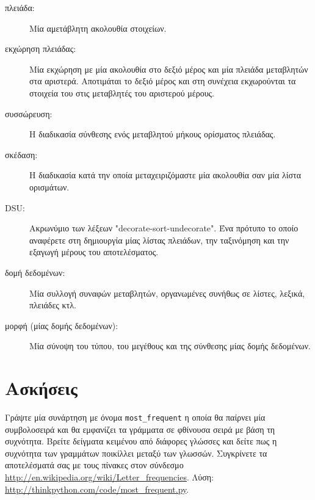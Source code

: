 \documentclass[10pt]{book}
\begin{document}
\begin{description}

\item[πλειάδα:] Μία αμετάβλητη ακολουθία στοιχείων.

\item[εκχώρηση πλειάδας:] Μία εκχώρηση με μία ακολουθία στο δεξιό μέρος και μία πλειάδα μεταβλητών στα αριστερά. Αποτιμάται το δεξιό μέρος και στη συνέχεια εκχωρούνται τα στοιχεία του στις μεταβλητές του αριστερού μέρους.

\item[συσσώρευση:] Η διαδικασία σύνθεσης ενός μεταβλητού μήκους ορίσματος πλειάδας.

\item[σκέδαση:] Η διαδικασία κατά την οποία μεταχειριζόμαστε μία ακολουθία σαν μία λίστα ορισμάτων.

\item[DSU:] Ακρωνύμιο των λέξεων "decorate-sort-undecorate". Ένα πρότυπο το οποίο αναφέρετε στη δημιουργία μίας λίστας πλειάδων, την ταξινόμηση και την εξαγωγή μέρους του αποτελέσματος.

\item[δομή δεδομένων:] Μία συλλογή συναφών μεταβλητών, οργανωμένες συνήθως σε λίστες, λεξικά, πλειάδες κτλ.

\item[μορφή (μίας δομής δεδομένων):] Μία σύνοψη του τύπου, του μεγέθους και της σύνθεσης μίας δομής δεδομένων.

\end{description}


\section{Ασκήσεις}

\begin{exercise}

Γράψτε μία συνάρτηση με όνομα \verb"most_frequent" η οποία θα παίρνει μία συμβολοσειρά και θα εμφανίζει τα γράμματα σε φθίνουσα σειρά με βάση τη συχνότητα. Βρείτε δείγματα κειμένου από διάφορες γλώσσες και δείτε πως η συχνότητα των γραμμάτων ποικίλλει μεταξύ των γλωσσών. Συγκρίνετε τα αποτελέσματά σας με τους πίνακες στον σύνδεσμο \url{http://en.wikipedia.org/wiki/Letter_frequencies}. Λύση: \url{http://thinkpython.com/code/most_frequent.py}.
\\

\end{exercise}
 
\end{document}

